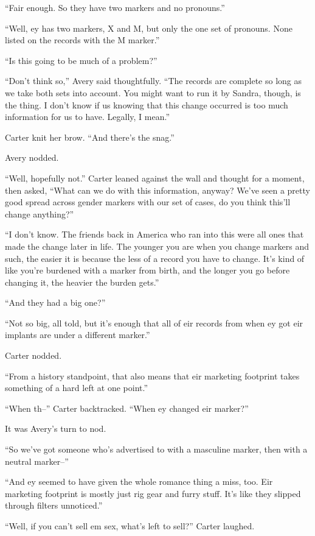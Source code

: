 ``Fair enough. So they have two markers and no pronouns.''

``Well, ey has two markers, X and M, but only the one set of pronouns. None listed on the records with the M marker.''

``Is this going to be much of a problem?''

``Don't think so,'' Avery said thoughtfully. ``The records are complete so long as we take both sets into account. You might want to run it by Sandra, though, is the thing. I don't know if us knowing that this change occurred is too much information for us to have. Legally, I mean.''

Carter knit her brow. ``And there's the snag.''

Avery nodded.

``Well, hopefully not.'' Carter leaned against the wall and thought for a moment, then asked, ``What can we do with this information, anyway? We've seen a pretty good spread across gender markers with our set of cases, do you think this'll change anything?''

``I don't know. The friends back in America who ran into this were all ones that made the change later in life. The younger you are when you change markers and such, the easier it is because the less of a record you have to change. It's kind of like you're burdened with a marker from birth, and the longer you go before changing it, the heavier the burden gets.''

``And they had a big one?''

``Not so big, all told, but it's enough that all of eir records from when ey got eir implants are under a different marker.''

Carter nodded.

``From a history standpoint, that also means that eir marketing footprint takes something of a hard left at one point.''

``When th--'' Carter backtracked. ``When ey changed eir marker?''

It was Avery's turn to nod.

``So we've got someone who's advertised to with a masculine marker, then with a neutral marker--''

``And ey seemed to have given the whole romance thing a miss, too. Eir marketing footprint is mostly just rig gear and furry stuff. It's like they slipped through filters unnoticed.''

``Well, if you can't sell em sex, what's left to sell?'' Carter laughed.

